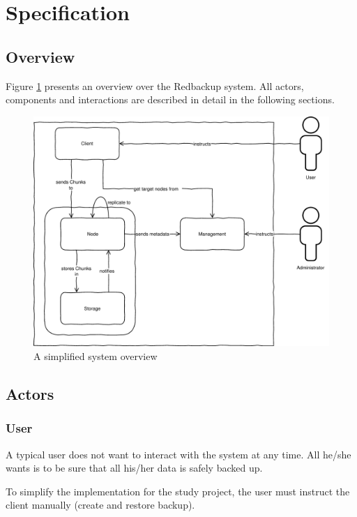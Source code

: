 
\section{Specification}\label{sec:specification}

\subsection{Overview}
Figure \ref{fig:architecture-overview} presents an overview over the Redbackup system. All actors, components and interactions are described in detail in the following sections.

\begin{figure}[h]
    \centering
    \includegraphics[width=1\linewidth]{resources/architecture_overview}
    \caption{A simplified system overview}
    \label{fig:architecture-overview}
\end{figure}

\subsection{Actors}

\subsubsection{User}
A typical \gls{user} does not want to interact with the system at any time. All he/she wants is to be sure that all his/her data is safely backed up.

To simplify the implementation for the study project, the \gls{user} must instruct the \gls{client} manually (create and restore backup).

